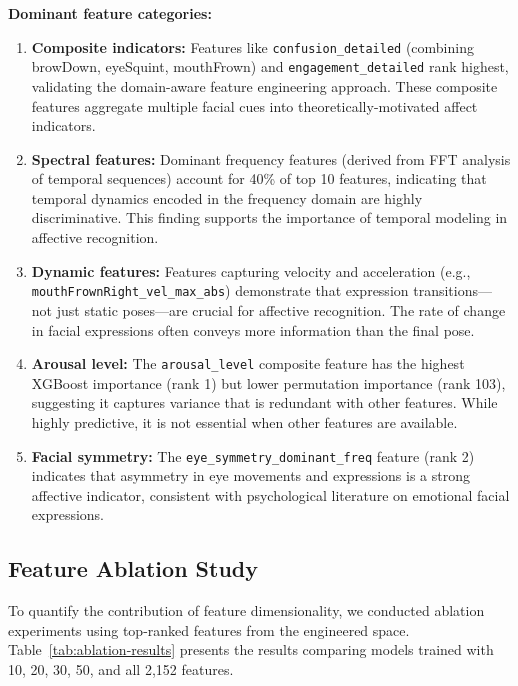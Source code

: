 \textbf{Dominant feature categories:}
\begin{enumerate}
    \item \textbf{Composite indicators:} Features like \texttt{confusion\_detailed} (combining browDown, eyeSquint, mouthFrown) and \texttt{engagement\_detailed} rank highest, validating the domain-aware feature engineering approach. These composite features aggregate multiple facial cues into theoretically-motivated affect indicators.

    \item \textbf{Spectral features:} Dominant frequency features (derived from FFT analysis of temporal sequences) account for 40\% of top 10 features, indicating that temporal dynamics encoded in the frequency domain are highly discriminative. This finding supports the importance of temporal modeling in affective recognition.

    \item \textbf{Dynamic features:} Features capturing velocity and acceleration (e.g., \texttt{mouthFrownRight\_vel\_max\_abs}) demonstrate that expression transitions---not just static poses---are crucial for affective recognition. The rate of change in facial expressions often conveys more information than the final pose.

    \item \textbf{Arousal level:} The \texttt{arousal\_level} composite feature has the highest XGBoost importance (rank 1) but lower permutation importance (rank 103), suggesting it captures variance that is redundant with other features. While highly predictive, it is not essential when other features are available.
    
    \item \textbf{Facial symmetry:} The \texttt{eye\_symmetry\_dominant\_freq} feature (rank 2) indicates that asymmetry in eye movements and expressions is a strong affective indicator, consistent with psychological literature on emotional facial expressions.
\end{enumerate}

\subsection{Feature Ablation Study}
\label{sec:feature-ablation}

To quantify the contribution of feature dimensionality, we conducted ablation experiments using top-ranked features from the engineered space. Table~\ref{tab:ablation-results} presents the results comparing models trained with 10, 20, 30, 50, and all 2,152 features.

